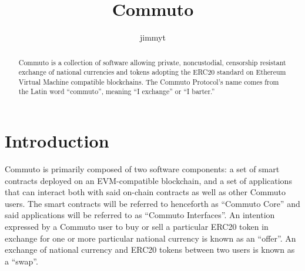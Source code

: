 \documentclass[11pt]{article}
\author{jimmyt}
\begin{document}
    \title{Commuto}
    \maketitle

    \begin{abstract}
    Commuto is a collection of software allowing private, noncustodial, censorship resistant
    exchange of national currencies and tokens adopting the ERC20\cite{ERC20} standard on
    Ethereum Virtual Machine\cite{Ethereum} compatible blockchains.
    The Commuto Protocol's name comes from the Latin word ``commuto'', meaning ``I exchange'' or ``I
    barter.''
    \end{abstract}

    \section*{Introduction}

    Commuto is primarily composed of two software components: a set of smart contracts deployed on
    an EVM-compatible blockchain, and a set of applications that can interact both with said
    on-chain contracts as well as other Commuto users.
    The smart contracts will be referred to henceforth as ``Commuto Core'' and said applications
    will be referred to as ``Commuto Interfaces''.
    An intention expressed by a Commuto user to buy or sell a particular ERC20 token in exchange for
    one or more particular national currency is known as an ``offer''.
    An exchange of national currency and ERC20 tokens between two users is known as a ``swap''.
\end{document}
